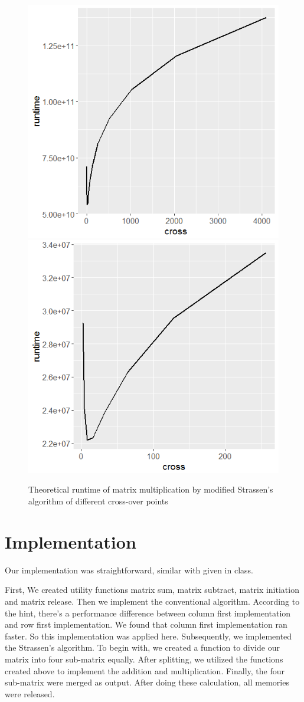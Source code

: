 \documentclass[a4paper, 11pt]{article}
\begin{document}
\begin{figure}[h]
	\includegraphics[width=0.5\linewidth]{Truntime}
	\includegraphics[width=0.5\linewidth]{Truntime8}
	\caption{Theoretical runtime of matrix multiplication by modified Strassen's algorithm of different cross-over points}
	\label{fig:truntime}
\end{figure}

\section*{Implementation}
Our implementation was straightforward, similar with given in class.

 First, We created utility functions matrix sum, matrix subtract, matrix initiation and matrix release. Then we implement the conventional algorithm. According to the hint, there's a performance difference between column first implementation and row first implementation. We found that column first implementation ran faster. So this implementation was applied here. Subsequently, we implemented the Strassen's algorithm. To begin with, we created a function to divide our matrix into four sub-matrix equally. After splitting, we utilized the functions created above to implement the addition and multiplication. Finally, the four sub-matrix were merged as output. After doing these calculation, all memories were released.
\end{document}
